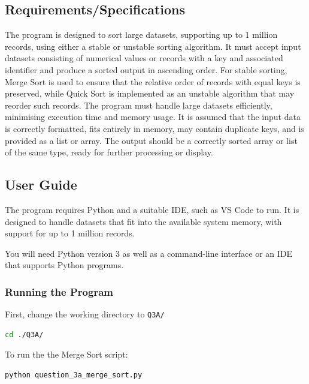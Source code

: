 \documentclass[12pt]{article}
\begin{document}
\subsection{Requirements/Specifications}

The program is designed to sort large datasets, supporting up to 1 million records, using either a
stable or unstable sorting algorithm. It must accept input datasets consisting of numerical values
or records with a key and associated identifier and produce a sorted output in ascending order.
For stable sorting, Merge Sort is used to ensure that the relative order of records with equal keys
is preserved, while Quick Sort is implemented as an unstable algorithm that may reorder such records\parencite{rizvi2024sorting_algorithms_in_focus}. The program must handle large datasets efficiently, minimising execution time and
memory usage. It is assumed that the input data is correctly formatted, fits entirely in memory,
may contain duplicate keys, and is provided as a list or array. The output should be a correctly
sorted array or list of the same type, ready for further processing or display.

\subsection{User Guide}

The program requires Python and a suitable IDE, such as VS Code to run. It is designed to handle datasets that fit into the available system memory, with support for up to 1 million records.

\noindent You will need Python version 3 as well as a command-line interface or an IDE that supports Python programs.

\subsubsection{Running the Program}

First, change the working directory to \texttt{Q3A/}

\begin{lstlisting}[language=bash]
cd ./Q3A/
\end{lstlisting}

\medskip
\noindent To run the the Merge Sort script:

\begin{lstlisting}[language=bash]
python question_3a_merge_sort.py
\end{lstlisting}
\end{document}
